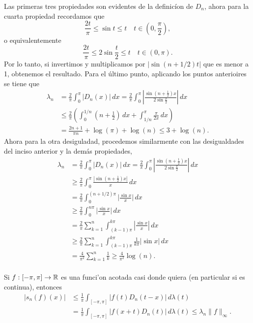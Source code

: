\documentclass[main.tex]{subfiles}
\begin{document}
    \dem Las primeras tres propiedades son evidentes de la definic\'ion de \(D_{n}\), ahora para la cuarta propiedad recordamos que
    \[
      \frac{2t}{\pi}\leq\sin t\leq t\quad t\in(0,\frac{\pi}{2}),
    \]
    o equivalentemente
    \[
      \frac{2t}{\pi}\leq2\sin \frac{t}{2}\leq t\quad t\in(0,\pi).
    \]
    Por lo tanto, si invertimos y multiplicamos por \(|\sin(n+1/2)t|\) que es menor a 1, obtenemos el resultado. Para el \'ultimo punto, aplicando los puntos anterioires se tiene que
    \begin{align*} \lambda_{n}
      &=\frac{2}{\pi}\int_{0}^{\pi}|D_{n}(x)|\,dx=\frac{2}{\pi}\int_{0}^{\pi}|\frac{\sin(n+\frac{1}{2})x}{2\sin\frac{x}{2}}|\,dx\\
      &\leq \frac{2}{\pi}\left(\int_{0}^{1/n}(n+\frac{1}{2})\,dx+\int_{1/n}^{\pi}\frac{\pi}{2x}\,dx\right)\\
      &=\frac{2n+1}{\pi n}+\log(\pi)+\log(n)\leq 3+\log(n).
    \end{align*}
    Ahora para la otra desiguladad, procedemos similarmente con las desigualdades del inciso anterior y la dem\'as propiedades,
    \begin{align*} \lambda_{n}
      &=\frac{2}{\pi}\int_{0}^{\pi}|D_{n}(x)|\,dx=\frac{2}{\pi}\int_{0}^{\pi}|\frac{\sin(n+\frac{1}{2})x}{2\sin\frac{x}{2}}|\,dx\\
      &\geq \frac{2}{\pi}\int_{0}^{\pi}\frac{|\sin(n+\frac{1}{2})x|}{x}\,dx\\
      &=\frac{2}{\pi}\int_{0}^{(n+1/2)\pi}\big|\frac{\sin x}{x}\big|\,dx\\
      &\geq\frac{2}{\pi}\int_{0}^{n\pi}\big|\frac{\sin x}{x}\big|\,dx\\
      &=\frac{2}{\pi}\sum_{k=1}^{n}\int_{(k-1)\pi}^{k\pi}|\frac{\sin x}{x}|\,dx\\
      &\geq\frac{2}{\pi}\sum_{k=1}^{n}\int_{(k-1)\pi}^{k\pi}\frac{1}{k\pi}|\sin x|\,dx\\
      &=\frac{4}{\pi^{2}}\sum_{k=1}^{n}\frac{1}{k}\geq\frac{4}{\pi^{2}}\log(n).
    \end{align*}
    \QED\\
    \obs Si \(f:[-\pi,\pi]\to\mathbb R \) es una funci'on acotada casi donde quiera (en particular si es continua), entonces
    \begin{align*}
      |s_{n}(f)(x)|&\leq\frac{1}{\pi}\int_{[-\pi,\pi]}|f(t)D_{n}(t-x)|\,d\lambda(t)\\
      &=\frac{1}{\pi}\int_{[-\pi,\pi]}|f(x+t)D_{n}(t)|\,d\lambda(t)\leq\lambda_{n}\|f\|_{\infty}.
    \end{align*}
\end{document}
